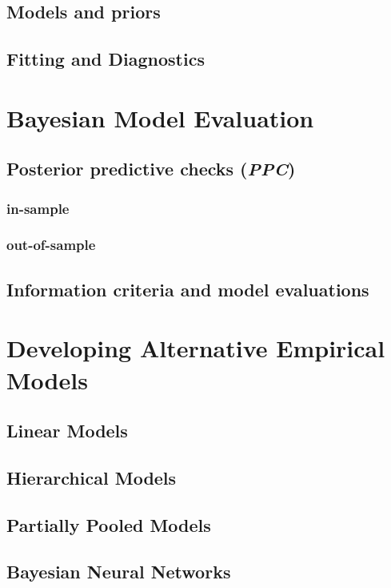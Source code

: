 \documentclass[10pt]{article}
\begin{document}
	\subsection{Models and priors}
	\subsection{Fitting and Diagnostics}
	
\newpage
\section{Bayesian Model Evaluation}
	\subsection{Posterior predictive checks (\textit{PPC})}
	\subsubsection{in-sample}
	\subsubsection{out-of-sample}
	\subsection{Information criteria and model evaluations}
	
\newpage
\section{Developing Alternative Empirical Models}
	\subsection{Linear Models}
	\subsection{Hierarchical Models}
	\subsection{Partially Pooled Models}
	\subsection{Bayesian Neural Networks}
\end{document}
